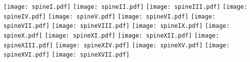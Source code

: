 \documentclass{article}
\begin{document}
\pagestyle{empty}%
\noindent
\texttt{[image: spineI.pdf]}%
\texttt{[image: spineII.pdf]}%
\texttt{[image: spineIII.pdf]}%
\texttt{[image: spineIV.pdf]}%
\texttt{[image: spineV.pdf]}%
\texttt{[image: spineVI.pdf]}%
\texttt{[image: spineVII.pdf]}%
\texttt{[image: spineVIII.pdf]}%
\texttt{[image: spineIX.pdf]}%
\texttt{[image: spineX.pdf]}%
\texttt{[image: spineXI.pdf]}%
\texttt{[image: spineXII.pdf]}%
\texttt{[image: spineXIII.pdf]}%
\texttt{[image: spineXIV.pdf]}%
\texttt{[image: spineXV.pdf]}%
\texttt{[image: spineXVI.pdf]}%
\texttt{[image: spineXVII.pdf]}%
\end{document}
